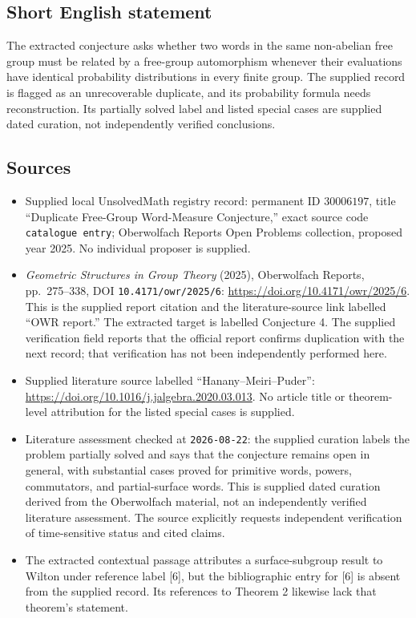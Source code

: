 \documentclass[11pt]{article}
\begin{document}
\subsection{Short English statement}
The extracted conjecture asks whether two words in the same non-abelian free group must be related by a free-group automorphism whenever their evaluations have identical probability distributions in every finite group. The supplied record is flagged as an unrecoverable duplicate, and its probability formula needs reconstruction. Its partially solved label and listed special cases are supplied dated curation, not independently verified conclusions.
\subsection{Sources}
\begin{itemize}
\item Supplied local UnsolvedMath registry record: permanent ID \(30006197\), title ``Duplicate Free-Group Word-Measure Conjecture,'' exact source code \texttt{catalogue entry}; Oberwolfach Reports Open Problems collection, proposed year 2025. No individual proposer is supplied.
\item \emph{Geometric Structures in Group Theory} (2025), Oberwolfach Reports, pp.\ 275--338, DOI \texttt{10.4171/owr/2025/6}: \url{https://doi.org/10.4171/owr/2025/6}. This is the supplied report citation and the literature-source link labelled ``OWR report.'' The extracted target is labelled Conjecture 4. The supplied verification field reports that the official report confirms duplication with the next record; that verification has not been independently performed here.
\item Supplied literature source labelled ``Hanany--Meiri--Puder'': \url{https://doi.org/10.1016/j.jalgebra.2020.03.013}. No article title or theorem-level attribution for the listed special cases is supplied.
\item Literature assessment checked at \texttt{2026-08-22}: the supplied curation labels the problem partially solved and says that the conjecture remains open in general, with substantial cases proved for primitive words, powers, commutators, and partial-surface words. This is supplied dated curation derived from the Oberwolfach material, not an independently verified literature assessment. The source explicitly requests independent verification of time-sensitive status and cited claims.
\item The extracted contextual passage attributes a surface-subgroup result to Wilton under reference label [6], but the bibliographic entry for [6] is absent from the supplied record. Its references to Theorem 2 likewise lack that theorem's statement.
\end{itemize}
\end{document}
